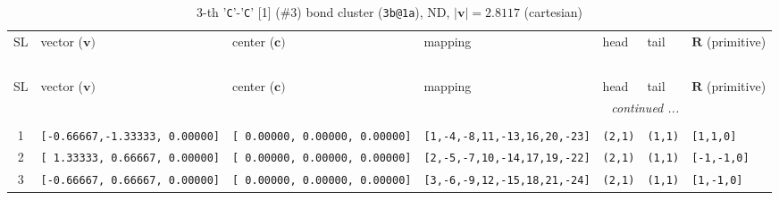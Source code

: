 \documentclass[fleqn,10pt,landscape]{jsarticle}
\begin{document}
\begin{longtable}[l]{cllllll}
\captionsetup{justification=raggedright, singlelinecheck=off}
\caption{3-th '\texttt{C}'-'\texttt{C}' [1] (\#3) bond cluster (\texttt{3b@1a}), ND, $|\bm{v}|=2.8117$ (cartesian)}
 \\
 \hline \hline
SL & vector ($\bm{v})$ & center ($\bm{c})$ & mapping & head & tail & $\bm{R}$ (primitive) \\ \hline \endfirsthead

\multicolumn{6}{l}{\tablename\ \thetable{}} \\
 \hline \hline
SL & vector ($\bm{v})$ & center ($\bm{c})$ & mapping & head & tail & $\bm{R}$ (primitive) \\ \hline \endhead

 \hline \hline
\multicolumn{6}{r}{\footnotesize\it continued ...} \\ \endfoot

 \hline \hline
\multicolumn{6}{r}{} \\ \endlastfoot

1 & \texttt{[-0.66667,-1.33333, 0.00000]} & \texttt{[ 0.00000, 0.00000, 0.00000]} & \texttt{[1,-4,-8,11,-13,16,20,-23]} & \texttt{(2,1)} & \texttt{(1,1)} & \texttt{[1,1,0]} \\ \hline
2 & \texttt{[ 1.33333, 0.66667, 0.00000]} & \texttt{[ 0.00000, 0.00000, 0.00000]} & \texttt{[2,-5,-7,10,-14,17,19,-22]} & \texttt{(2,1)} & \texttt{(1,1)} & \texttt{[-1,-1,0]} \\ \hline
3 & \texttt{[-0.66667, 0.66667, 0.00000]} & \texttt{[ 0.00000, 0.00000, 0.00000]} & \texttt{[3,-6,-9,12,-15,18,21,-24]} & \texttt{(2,1)} & \texttt{(1,1)} & \texttt{[1,-1,0]} \\
\end{longtable}
\renewcommand{\arraystretch}{1.6}
\end{document}
